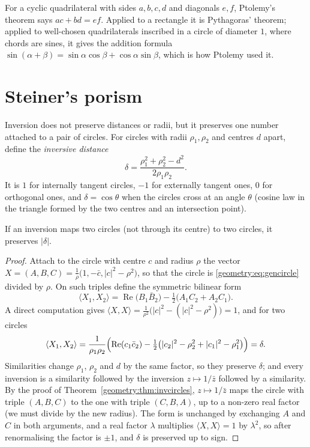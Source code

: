 For a cyclic quadrilateral with sides $a,b,c,d$ and diagonals $e,f$, Ptolemy's theorem says $ac+bd=ef$. Applied to a rectangle it is
Pythagoras' theorem; applied to well-chosen quadrilaterals inscribed in a circle of diameter $1$, where chords are sines, it gives the
addition formula $\sin(\alpha+\beta)=\sin\alpha\cos\beta+\cos\alpha\sin\beta$, which is how Ptolemy used it.

\section{Steiner's porism}

Inversion does not preserve distances or radii, but it preserves one number attached to a pair of circles. For circles with radii
$\rho_1,\rho_2$ and centres $d$ apart, define the \emph{inversive distance}
\[
\delta=\frac{\rho_1^2+\rho_2^2-d^2}{2\rho_1\rho_2}.
\]
It is $1$ for internally tangent circles, $-1$ for externally tangent ones, $0$ for orthogonal ones, and $\delta=\cos\theta$ when the circles
cross at an angle $\theta$ (cosine law in the triangle formed by the two centres and an intersection point).

\begin{proposition}\label{geometry:prop:invdistance}
If an inversion maps two circles (not through its centre) to two circles, it preserves $|\delta|$.
\end{proposition}
\begin{proof}
Attach to the circle with centre $c$ and radius $\rho$ the vector $X=(A,B,C)=\frac1\rho\bigl(1,-\bar c,|c|^2-\rho^2\bigr)$, so that the circle
is \eqref{geometry:eq:gencircle} divided by $\rho$. On such triples define the symmetric bilinear form
\[
\langle X_1,X_2\rangle=\operatorname{Re}\bigl(B_1\bar B_2\bigr)-\tfrac12\bigl(A_1C_2+A_2C_1\bigr).
\]
A direct computation gives $\langle X,X\rangle=\frac1{\rho^2}\bigl(|c|^2-(|c|^2-\rho^2)\bigr)=1$, and for two circles
\[
\langle X_1,X_2\rangle=\frac1{\rho_1\rho_2}\Bigl(\operatorname{Re}(c_1\bar c_2)-\tfrac12\bigl(|c_2|^2-\rho_2^2+|c_1|^2-\rho_1^2\bigr)\Bigr)=\delta .
\]
Similarities change $\rho_1$, $\rho_2$ and $d$ by the same factor, so they preserve $\delta$; and every inversion is a similarity followed by the
inversion $z\mapsto1/\bar z$ followed by a similarity. By the proof of Theorem~\ref{geometry:thm:invcircles}, $z\mapsto1/\bar z$ maps the circle with
triple $(A,B,C)$ to the one with triple $(C,B,A)$, up to a non-zero real factor (we must divide by the new radius). The form is unchanged by
exchanging $A$ and $C$ in both arguments, and a real factor $\lambda$ multiplies $\langle X,X\rangle=1$ by $\lambda^2$, so after renormalising
the factor is $\pm1$, and $\delta$ is preserved up to sign.
\end{proof}


